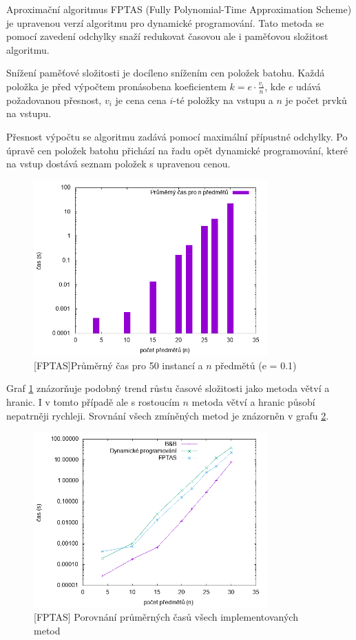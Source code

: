 \documentclass{article}
\begin{document}
Aproximační algoritmus FPTAS (Fully Polynomial-Time Approximation Scheme) je upravenou verzí algoritmu pro dynamické programování. Tato metoda se pomocí zavedení odchylky snaží redukovat časovou ale i paměťovou složitost algoritmu.

Snížení paměťové složitosti je docíleno snížením cen položek batohu.
Každá položka je před výpočtem pronásobena koeficientem $k = e \cdot \frac{v_i}{n}$, kde $e$ udává požadovanou přesnost, $v_i$ je cena cena $i$-té položky na vstupu a $n$ je počet prvků na vstupu.

Přesnost výpočtu se algoritmu zadává pomocí maximální přípustné odchylky.
Po úpravě cen položek batohu přichází na řadu opět dynamické programování, které na vstup dostává seznam položek s upravenou cenou.

\begin{figure}[ht]
    \centering
    \includegraphics[width=0.8\textwidth]{fptas-duration.png}
    \caption{[FPTAS]Průměrný čas pro 50 instancí a $n$ předmětů (e = 0.1)}
    \label{fig:g3}
\end{figure}

Graf \ref{fig:g3} znázorňuje podobný trend růstu časové složitosti jako metoda větví a hranic.
I v tomto případě ale s rostoucím $n$ metoda větví a hranic působí nepatrněji rychleji.
Srovnání všech zmíněných metod je znázorněn v grafu \ref{fig:g4}.

\begin{figure}[ht]
    \centering
    \includegraphics[width=0.8\textwidth]{multiplot.png}
    \caption{[FPTAS] Porovnání průměrných časů všech implementovaných metod}
    \label{fig:g4}
\end{figure}
\end{document}
